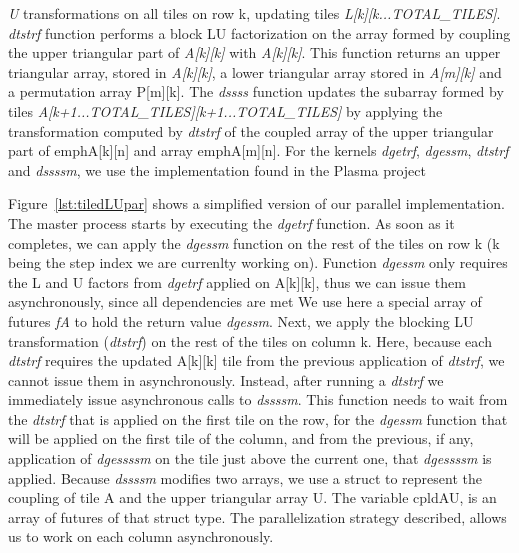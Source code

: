 \emph{U} transformations on all tiles on row k, updating tiles \emph{L[k][k...TOTAL\_TILES]}. \emph{dtstrf}
function performs a block LU factorization on the array formed by coupling the upper triangular part of
\emph{A[k][k]} with \emph{A[k][k]}.
This function returns an upper triangular array, stored in \emph{A[k][k]}, a lower triangular array 
stored in \emph{A[m][k]} and a permutation array P[m][k].  The \emph{dssss} function updates the subarray
formed by tiles \emph{A[k+1...TOTAL\_TILES][k+1...TOTAL\_TILES]} by applying the  transformation computed by \emph{dtstrf}
of the coupled array of the upper triangular part of emph{A[k][n]} and array emph{A[m][n]}.  For the kernels \emph{dgetrf},
\emph{dgessm}, \emph{dtstrf} and \emph{dssssm}, we use the implementation found in the Plasma project
~\cite{1742-6596-180-1-012037} 

	
	Figure~\ref{lst:tiledLUpar} shows a simplified version of our parallel implementation.  The master process 
starts by executing the \emph{dgetrf}  function.  As soon as it completes, we can apply 
the \emph{dgessm} function on the rest of the tiles on row k (k being the step index we are currenlty working on).
Function \emph{dgessm} only requires the L and U factors from \emph{dgetrf} applied on A[k][k], thus we can issue them 
asynchronously, since all dependencies are met
We use here a special array of futures \emph{fA} to hold the return value \emph{dgessm}.   
Next, we apply the blocking LU transformation (\emph{dtstrf}) on the rest of the tiles on column k.  Here, because
each \emph{dtstrf} requires the updated A[k][k] tile from the previous application of \emph{dtstrf}, we cannot issue
them in asynchronously.  Instead, after running a \emph{dtstrf} we immediately issue asynchronous calls to \emph{dssssm}.
This function needs to wait from the \emph{dtstrf} that is applied on the first tile on the row, for the \emph{dgessm}
function that will be applied on the first tile of the column, and from the previous, if any, application of \emph{dgessssm}
on the tile just above the current one, that \emph{dgessssm} is applied.  Because \emph{dssssm} modifies two arrays, we use
a struct to represent the coupling of tile A and the upper triangular array U.  The variable cpldAU, is an array of futures
of that struct type.  The parallelization strategy described, allows us to work on each column asynchronously.  

